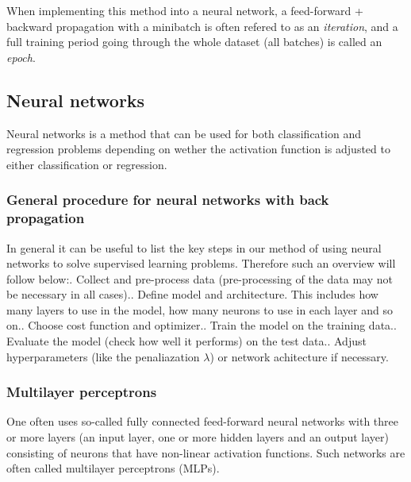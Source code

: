 \documentclass[a4paper,12pt]{article}
\begin{document}
When implementing this method into a neural network, a feed-forward + backward propagation with a minibatch is often refered to as an \emph{iteration}, and a full training period going through the whole dataset (all batches) is called an \emph{epoch}.

\subsection{Neural networks}
Neural networks is a method that can be used for both classification and regression problems depending on wether the activation function is adjusted to either classification or regression.

\subsubsection{General procedure for neural networks with back propagation}
In general it can be useful to list the key steps in our method of using neural networks to solve supervised learning problems. Therefore such an overview will follow below:. Collect and pre-process data (pre-processing of the data may not be necessary in all cases).. Define model and architecture. This includes how many layers to use in the model, how many neurons to use in each layer and so on.. Choose cost function and optimizer.. Train the model on the training data.. Evaluate the model (check how well it performs) on the test data.. Adjust hyperparameters (like the penaliazation $\lambda$) or network achitecture if necessary.

\subsubsection{Multilayer perceptrons}
One often uses so-called fully connected feed-forward neural networks with three or more layers (an input layer, one or more hidden layers and an output layer) consisting of neurons that have non-linear activation functions. Such networks are often called multilayer perceptrons (MLPs).\newline
\end{document}
